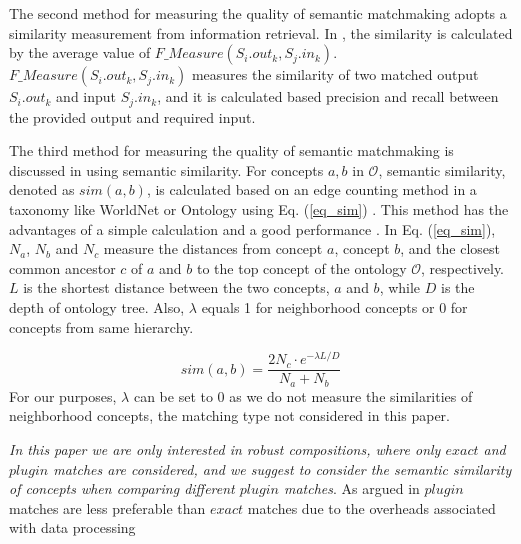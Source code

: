 The second method for measuring the quality of semantic matchmaking adopts a similarity measurement from information retrieval. In \cite{pop2009immune}, the similarity is calculated by the average value of $F\_Measure(S_i.out_k, S_j.in_k)$. $F\_Measure(S_i.out_k, S_j.in_k)$ measures the similarity of two matched output $S_i.out_k$ and input $S_j.in_k$, and it is calculated based precision and recall between the provided output and required input.


The third method for measuring the quality of semantic matchmaking is discussed in \cite{shet2012new} using semantic similarity. For concepts $a, b$ in $\mathcal{O}$, semantic similarity, denoted as $sim(a, b)$, is calculated based on an edge counting method in a taxonomy like WorldNet or Ontology using Eq. (\ref{eq_sim}) \cite{shet2012new}. This method has the advantages of a simple calculation and a good performance . In Eq. (\ref{eq_sim}), $N_a$, $N_b$ and $N_c$ measure the distances from concept $a$, concept $b$, and the closest common ancestor $c$ of $a$ and $b$ to the top concept of the ontology $\mathcal{O}$, respectively.  $L$ is the shortest distance between the two concepts, $a$ and $b$, while $D$ is the depth of ontology tree. Also, $\lambda$ equals 1 for neighborhood concepts or 0 for concepts from same hierarchy.

\begin{equation}
sim(a, b){=} \frac{2N_c \cdot e^{-\lambda L/D} }{N_{a}+N_{b}}
\label{eq_sim}
\end{equation}
\noindent For our purposes, $\lambda$ can be set to 0 as we do not measure the similarities of neighborhood concepts, the matching type not considered in this paper. 

\emph{In this paper we are only interested in robust compositions, where only $exact$ and $plugin$ matches are considered, and we suggest to consider the semantic similarity of concepts when comparing different $plugin$ matches}. As argued in \cite{lecue2009optimizing} $plugin$ matches are less preferable than $exact$ matches due to the overheads associated with data processing


